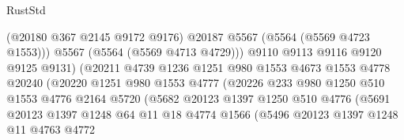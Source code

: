 \begin{lexlean}{RustStd}
\begin{coremodule}
                                      (@20180 @367 @2145 @9172 @9176)
                                      @20187
                                      @5567
                                      (@5564 (@5569 @4723 @1553)))
                                    @5567
                                    (@5564 (@5569 @4713 @4729)))
                                  @9110
                                  @9113
                                  @9116
                                  @9120
                                  @9125
                                  @9131)
                                (@20211
                                  @4739
                                  @1236
                                  @1251
                                  @980
                                  @1553
                                  @4673
                                  @1553
                                  @4778
                                  @20240
                                  (@20220
                                    @1251
                                    @980
                                    @1553
                                    @4777
                                    (@20226
                                      @233
                                      @980
                                      @1250
                                      @510
                                      @1553
                                      @4776
                                      @2164
                                      @5720
                                      (@5682
                                        @20123
                                        @1397
                                        @1250
                                        @510
                                        @4776
                                        (@5691
                                          @20123
                                          @1397
                                          @1248
                                          @64
                                          @11
                                          @18
                                          @4774
                                          @1566
                                          (@5496
                                            @20123
                                            @1397
                                            @1248
                                            @11
                                            @4763
                                            @4772

\end{coremodule}
\end{lexlean}
